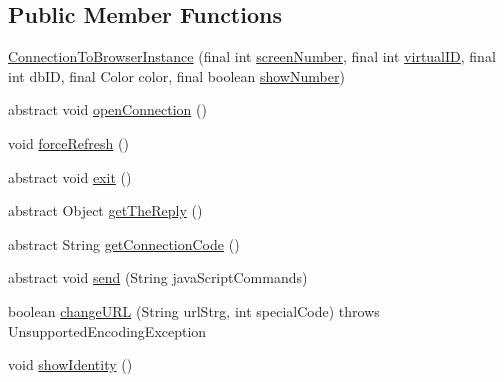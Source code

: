 \subsection*{Public Member Functions}
\begin{DoxyCompactItemize}
\item 
\hyperlink{classgov_1_1fnal_1_1ppd_1_1dd_1_1display_1_1client_1_1ConnectionToBrowserInstance_a5e820932a7dcbbed0c7415a58126344f}{Connection\-To\-Browser\-Instance} (final int \hyperlink{classgov_1_1fnal_1_1ppd_1_1dd_1_1display_1_1client_1_1ConnectionToBrowserInstance_a987b6e9010a2a8638689aae316cd0063}{screen\-Number}, final int \hyperlink{classgov_1_1fnal_1_1ppd_1_1dd_1_1display_1_1client_1_1ConnectionToBrowserInstance_a46edc5a7bac5d819516ff0092d7478e8}{virtual\-I\-D}, final int db\-I\-D, final Color color, final boolean \hyperlink{classgov_1_1fnal_1_1ppd_1_1dd_1_1display_1_1client_1_1ConnectionToBrowserInstance_a2f2ffa53ac708358dde068e9e3b282ba}{show\-Number})
\item 
abstract void \hyperlink{classgov_1_1fnal_1_1ppd_1_1dd_1_1display_1_1client_1_1ConnectionToBrowserInstance_a6ea35c69c6beea9fc6432c7cdd969d63}{open\-Connection} ()
\item 
void \hyperlink{classgov_1_1fnal_1_1ppd_1_1dd_1_1display_1_1client_1_1ConnectionToBrowserInstance_abc6c5f397d2c3caa8120f0c5fc162eac}{force\-Refresh} ()
\item 
abstract void \hyperlink{classgov_1_1fnal_1_1ppd_1_1dd_1_1display_1_1client_1_1ConnectionToBrowserInstance_aa27f7bfb9140d6e4a7cd445cdade8460}{exit} ()
\item 
abstract Object \hyperlink{classgov_1_1fnal_1_1ppd_1_1dd_1_1display_1_1client_1_1ConnectionToBrowserInstance_a4450f02846a8a1329ca4a98afc2d1177}{get\-The\-Reply} ()
\item 
abstract String \hyperlink{classgov_1_1fnal_1_1ppd_1_1dd_1_1display_1_1client_1_1ConnectionToBrowserInstance_ada329c14279c5b9c099f7d9a3444f1e5}{get\-Connection\-Code} ()
\item 
abstract void \hyperlink{classgov_1_1fnal_1_1ppd_1_1dd_1_1display_1_1client_1_1ConnectionToBrowserInstance_ab58e70a2a6f47d1dc596f16fe33dedab}{send} (String java\-Script\-Commands)
\item 
boolean \hyperlink{classgov_1_1fnal_1_1ppd_1_1dd_1_1display_1_1client_1_1ConnectionToBrowserInstance_aa6927802e8cbd589721f2d44cf6fef5c}{change\-U\-R\-L} (String url\-Strg, int special\-Code)  throws Unsupported\-Encoding\-Exception 
\item 
void \hyperlink{classgov_1_1fnal_1_1ppd_1_1dd_1_1display_1_1client_1_1ConnectionToBrowserInstance_a667bbe4dea46410bf5b1c6ea4e7d6a33}{show\-Identity} ()

\end{DoxyCompactItemize}
